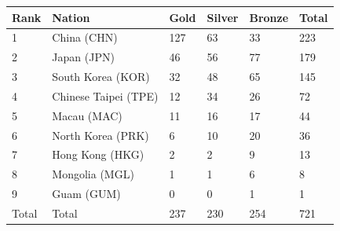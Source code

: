 \documentclass{article}
\begin{document}
\begin{tabular}{llllll}
\toprule
Rank & Nation & Gold & Silver & Bronze & Total \\
\midrule
1 & China (CHN) & 127 & 63 & 33 & 223 \\
2 & Japan (JPN) & 46 & 56 & 77 & 179 \\
3 & South Korea (KOR) & 32 & 48 & 65 & 145 \\
4 & Chinese Taipei (TPE) & 12 & 34 & 26 & 72 \\
5 & Macau (MAC) & 11 & 16 & 17 & 44 \\
6 & North Korea (PRK) & 6 & 10 & 20 & 36 \\
7 & Hong Kong (HKG) & 2 & 2 & 9 & 13 \\
8 & Mongolia (MGL) & 1 & 1 & 6 & 8 \\
9 & Guam (GUM) & 0 & 0 & 1 & 1 \\
Total & Total & 237 & 230 & 254 & 721 \\
\bottomrule
\end{tabular}
\end{document}
